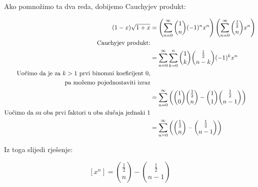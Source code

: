\documentclass{article}
\begin{document}
	Ako pomnožimo ta dva reda, dobijemo Cauchyjev produkt:
	
	\begin{align*}
		(1 - x) \sqrt{1 + x} &= \left ( \sum\limits^\infty_{n=0} \binom{1}{n} (-1)^n x^n \right ) \left ( \sum\limits^\infty_{n=0} \binom{\frac{1}{2}}{n} x^n \right ) \\
		\text{Cauchyjev produkt:} \\
		&= \sum\limits^\infty_{n=0} \sum\limits^n_{k=0} \binom{1}{k} \binom{\frac{1}{2}}{n - k} (-1)^k x^n \\
		\text{Uočimo da je za \( k > 1 \) prvi binomni koeficijent 0,} \\
		\text{ pa možemo pojednostaviti izraz} \\
		&= \sum\limits^\infty_{n=0} \left ( \binom{1}{0} \binom{\frac{1}{2}}{n} - \binom{1}{1} \binom{\frac{1}{2}}{n - 1} \right ) \\
		\text{Uočimo da su oba prvi faktori u oba slučaja jednaki 1} \\
		&= \sum\limits^\infty_{n=0} \left ( \binom{\frac{1}{2}}{n} - \binom{\frac{1}{2}}{n - 1} \right ) \\
	\end{align*}
	
	Iz toga slijedi rješenje:
	
	\[ [x^n] = \binom{\frac{1}{2}}{n} - \binom{\frac{1}{2}}{n - 1} \]
\end{document}
